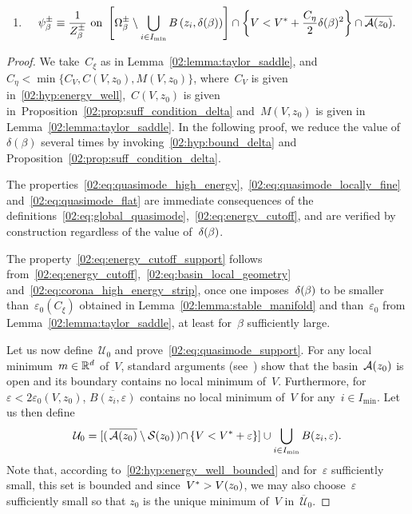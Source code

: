 \begin{proposition}
\begin{enumerate}[]
                    \item{\begin{equation}\label{02:eq:quasimode_flat}
                        \psi_\beta^\pm \equiv \frac1{Z_\beta^\pm}\text{ on }\left[\Omega_\beta^\pm \setminus \bigcup_{i\in I_{\min}} B\left(z_i,\delta(\beta)\right)\right] \cap \left\{V < V^* + \frac{C_\eta}2\delta(\beta)^2\right\} \cap \overline{\mathcal{A}(z_0)}.
                    \end{equation}}
                \end{enumerate}
            \end{proposition}
            \begin{proof}

                We take~$C_\xi$ as in Lemma~\ref{02:lemma:taylor_saddle}, and~$C_\eta < \min\{C_V,C(V,z_0),M(V,z_0)\}$, where~$C_V$ is given in~\eqref{02:hyp:energy_well},~$C(V,z_0)$ is given in~Proposition~\ref{02:prop:suff_condition_delta} and~$M(V,z_0)$ is given in Lemma~\ref{02:lemma:taylor_saddle}.
                In the following proof, we reduce the value of~$\delta(\beta)$ several times by invoking~\eqref{02:hyp:bound_delta} and Proposition~\ref{02:prop:suff_condition_delta}.

                The properties~\eqref{02:eq:quasimode_high_energy},~\eqref{02:eq:quasimode_locally_fine} and~\eqref{02:eq:quasimode_flat} are immediate consequences of the definitions~\eqref{02:eq:global_quasimode},~\eqref{02:eq:energy_cutoff}, and are verified by construction regardless of the value of~$\delta(\beta)$.
                
                The property~\eqref{02:eq:energy_cutoff_support} follows from~\eqref{02:eq:energy_cutoff},~\eqref{02:eq:basin_local_geometry} and~\eqref{02:eq:corona_high_energy_strip}, once one imposes~$\delta(\beta)$ to be smaller than~$\varepsilon_0(C_\xi)$ obtained in Lemma~\ref{02:lemma:stable_manifold} and than~$\varepsilon_0$ from Lemma~\ref{02:lemma:taylor_saddle}, at least for~$\beta$ sufficiently large.

                Let us now define~$\mathcal U_0$ and prove~\eqref{02:eq:quasimode_support}. For any local minimum~$m\in\mathbb{R}^d$ of~$V$, standard arguments (see~\cite[Chapter 8]{T24}) show that the basin~$\mathcal{A}(z_0)$ is open and its boundary contains no local minimum of~$V$.
                Furthermore, for~$\varepsilon<2\varepsilon_0(V,z_0)$, $\overline{B(z_i,\varepsilon)}$ contains no local minimum of~$V$ for any~$i\in I_{\min}$. Let us then define
                \[\mathcal U_0 = \left[\right(\overline{\mathcal{A}(z_0)}\setminus \mathcal S(z_0)\left)\cap \left\{V<V^* + \varepsilon \right\}\right] \cup\bigcup_{i\in I_{\min}} B(z_i,\varepsilon).\]
                Note that, according to~\eqref{02:hyp:energy_well_bounded} and for~$\varepsilon$ sufficiently small, this set is bounded and since~$V^*>V(z_0)$, we may also choose~$\varepsilon$ sufficiently small so that $z_0$ is the unique minimum of~$V$ in~$\overline{\mathcal U}_0$.
                

\end{proof}
